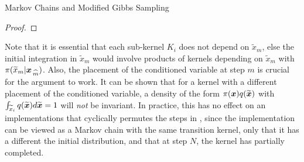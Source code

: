\begin{chapter}{Markov Chains and Modified Gibbs Sampling}
\begin{proof}
\end{proof}
Note that it is essential that each sub-kernel $K_i$ does not depend on $\tilde x_m$,  else the initial integration in $\tilde x_m$ would involve products of kernels depending on $\tilde x_m$ with $\pi(\widetilde x_m|\mbox{\boldmath$x$}_{\,\widehat{m}})$. %
Also, the placement of the conditioned variable at step $m$ is crucial for the argument to work.  
It can be shown that for a kernel with a different placement of the conditioned variable, a density of the form $\pi(\mbox{\boldmath$x$})q(\widetilde{\mbox{\boldmath$x$}})$ with $\int_{\widetilde x_i} q(\widetilde{\mbox{\boldmath$x$}})d\widetilde{\mbox{\boldmath$x$}} = 1$ will \emph{not} be invariant.
In practice, this has no effect on an implementations that cyclically permutes the steps in , since the implementation can be viewed as a Markov chain with the same transition kernel, only that it has a different the initial distribution, and that at step $N$, the kernel has partially completed.


\end{chapter}
